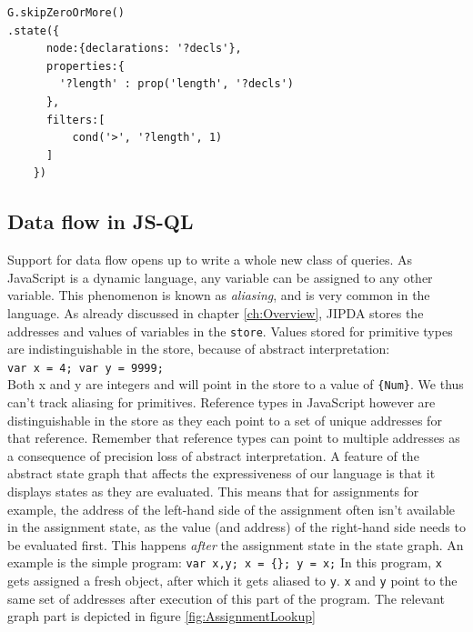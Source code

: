 \begin{lstlisting}[label={lst:multipleDeclarations},language=JSQL, caption=Filtering for multiple declarations,mathescape=true]
G.skipZeroOrMore()
.state({
      node:{declarations: '?decls'},
      properties:{
        '?length' : prop('length', '?decls')
      },
      filters:[
          cond('>', '?length', 1)
      ]
    }) 
\end{lstlisting}

\subsection{Data flow in JS-QL}

Support for data flow opens up to write a whole new class of queries. As JavaScript is a dynamic language, any variable can be assigned to any other variable. This phenomenon is known as \textit{aliasing}, and is very common in the language. As already discussed in chapter \ref{ch:Overview}, JIPDA stores the addresses and values of variables in the \texttt{store}. Values stored for primitive types are indistinguishable in the store, because of abstract interpretation:\\
\texttt{var x = 4; var y = 9999;}\\
Both x and y are integers and will point in the store to a value of \texttt{\{Num\}}. We thus can't track aliasing for primitives. Reference types in JavaScript however are distinguishable in the store as they each point to a set of unique addresses for that reference. Remember that reference types can point to multiple addresses as a consequence of precision loss of abstract interpretation. A feature of the abstract state graph that affects the expressiveness of our language is that it displays states as they are evaluated. This means that for assignments for example, the address of the left-hand side of the assignment often isn't available in the assignment state, as the value (and address) of the right-hand side needs to be evaluated first. This happens \textit{after} the assignment state in the state graph. An example is the simple program: 
\texttt{var x,y; x = \{\}; y = x;}
In this program, \texttt{x} gets assigned a fresh object, after which it gets aliased to \texttt{y}. \texttt{x} and \texttt{y} point to the same set of addresses after execution of this part of the program.
The relevant graph part is depicted in figure \ref{fig:AssignmentLookup}

